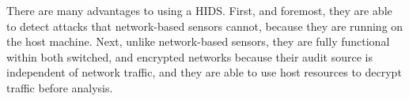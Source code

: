 \documentclass{acm_proc_article-sp}
\begin{document}
    		There are many advantages to using a HIDS. First, and foremost, they are able to detect attacks that network-based sensors cannot, because they are running on the host machine. Next, unlike network-based sensors, they are fully functional within both switched, and encrypted networks because their audit source is independent of network traffic, and they are able to use host resources to decrypt traffic before analysis.
    
\end{document}
